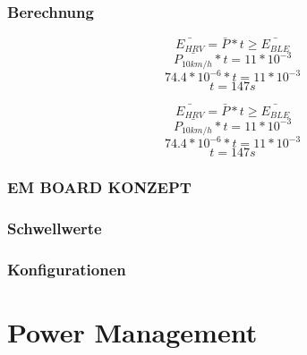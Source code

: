 \subsubsection*{Berechnung}

\[\bar{E_{HRV}} = \bar{P} * t \ge \bar{E_{BLE}}  \]
\[\bar{P_{10km/h}} * t = 11 * 10^{-3}  \]
\[74.4 * 10^{-6} * t = 11 * 10^{-3}   \]
\[t = 147 s  \]

\[\bar{E_{HRV}} = \bar{P} * t \ge \bar{E_{BLE}}  \]
\[\bar{P_{10km/h}} * t = 11 * 10^{-3}  \]
\[74.4 * 10^{-6} * t = 11 * 10^{-3}   \]
\[t = 147 s  \]

\subsubsection*{EM BOARD KONZEPT}
\subsubsection*{Schwellwerte}
\subsubsection*{Konfigurationen}



\section{Power Management}





%
%
%
%
%



